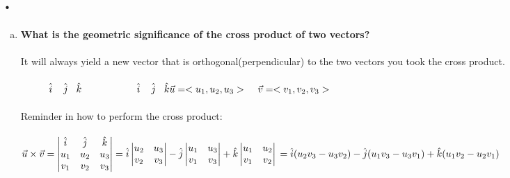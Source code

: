 \documentclass{article}
\begin{document}
\section{.}
\begin{enumerate}[a.]
\item \textbf{What is the geometric significance of the cross product of two vectors?}\\
\\
It will always yield a new vector that is orthogonal(perpendicular) to the two vectors you took the cross product.\\
\\

$\hspace{1cm}\hat{i}\hspace{.4cm}\hat{j}\hspace{.3cm}\hat{k}\hspace{2cm}\hat{i}\hspace{.4cm}\hat{j}\hspace{.3cm}\hat{k}\\\vec{u} = <u_{1},u_{2},u_{3}>\hspace{.4cm}\vec{v} = <v_{1},v_{2},v_{3}>$\\
\\
Reminder in how to perform the cross product:\\
\\
$\vec{u}\times\vec{v}=\begin{vmatrix}
\hat{i}&\hat{j}&\hat{k}\\
u_{1}&u_{2}&u_{3}\\
v_{1}&v_{2}&v_{3}\\
\end{vmatrix}=\hat{i}
\begin{vmatrix}
u_{2}&u_{3}\\
v_{2}&v_{3}\\
\end{vmatrix}-\hat{j}\begin{vmatrix}
u_{1}&u_{3}\\
v_{1}&v_{3}\\
\end{vmatrix}+\hat{k}\begin{vmatrix}
u_{1}&u_{2}\\
v_{1}&v_{2}\\
\end{vmatrix}\\
=\hat{i}(u_{2}v_{3}-u_{3}v_{2})-\hat{j}(u_{1}v_{3}-u_{3}v_{1})+\hat{k}(u_{1}v_{2}-u_{2}v_{1})$\\
\\

\end{enumerate}
\end{document}
